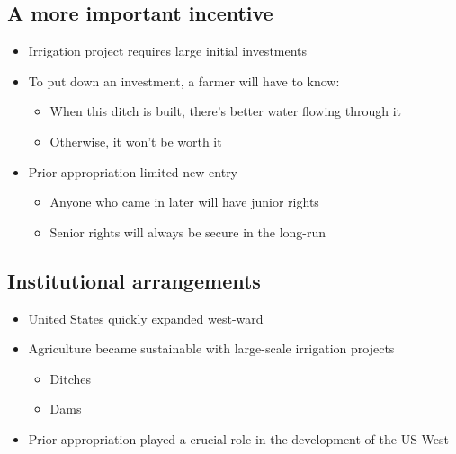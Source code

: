 \documentclass[]{article}
\providecommand{\tightlist}{%
  \setlength{\itemsep}{0pt}\setlength{\parskip}{0pt}}
\begin{document}
\hypertarget{a-more-important-incentive}{%
\subsection{A more important
incentive}\label{a-more-important-incentive}}

\begin{itemize}
\tightlist
\item
  Irrigation project requires large initial investments
\item
  To put down an investment, a farmer will have to know:

  \begin{itemize}
  \tightlist
  \item
    When this ditch is built, there's better water flowing through it
  \item
    Otherwise, it won't be worth it
  \end{itemize}
\item
  Prior appropriation limited new entry

  \begin{itemize}
  \tightlist
  \item
    Anyone who came in later will have junior rights
  \item
    Senior rights will always be secure in the long-run
  \end{itemize}
\end{itemize}

\hypertarget{institutional-arrangements}{%
\subsection{Institutional
arrangements}\label{institutional-arrangements}}

\begin{itemize}
\tightlist
\item
  United States quickly expanded west-ward
\item
  Agriculture became sustainable with large-scale irrigation projects

  \begin{itemize}
  \tightlist
  \item
    Ditches
  \item
    Dams
  \end{itemize}
\item
  Prior appropriation played a crucial role in the development of the US
  West
\end{itemize}
\end{document}
